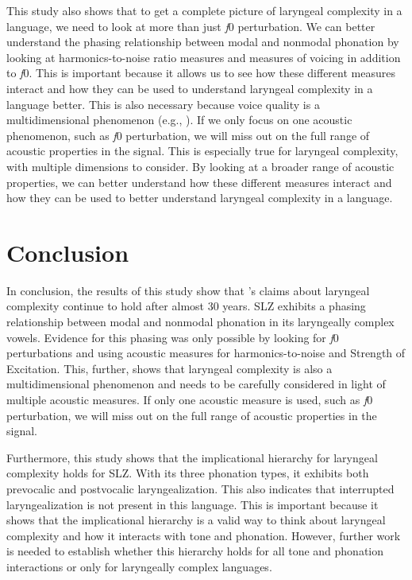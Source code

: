 This study also shows that to get a complete picture of laryngeal complexity in a language, we need to look at more than just \textit{f}0 perturbation. We can better understand the phasing relationship between modal and nonmodal phonation by looking at harmonics-to-noise ratio measures and measures of voicing in addition to \textit{f}0. This is important because it allows us to see how these different measures interact and how they can be used to understand laryngeal complexity in a language better. This is also necessary because voice quality is a multidimensional phenomenon (e.g., \cite{kreimanUnifiedTheoryVoice2014,kreimanValidatingPsychoacousticModel2021}). If we only focus on one acoustic phenomenon, such as \textit{f}0 perturbation, we will miss out on the full range of acoustic properties in the signal. This is especially true for laryngeal complexity, with multiple dimensions to consider. By looking at a broader range of acoustic properties, we can better understand how these different measures interact and how they can be used to better understand laryngeal complexity in a language.

\section{Conclusion}\label{sec:conclusion_of_lc}

In conclusion, the results of this study show that \citeauthor{silvermanLaryngealComplexityOtomanguean1997}'s \citeyear{silvermanLaryngealComplexityOtomanguean1997} claims about laryngeal complexity continue to hold after almost 30 years. SLZ exhibits a phasing relationship between modal and nonmodal phonation in its laryngeally complex vowels. Evidence for this phasing was only possible by looking for \textit{f}0 perturbations and using acoustic measures for harmonics-to-noise and Strength of Excitation. This, further, shows that laryngeal complexity is also a multidimensional phenomenon and needs to be carefully considered in light of multiple acoustic measures. If only one acoustic measure is used, such as \textit{f}0 perturbation, we will miss out on the full range of acoustic properties in the signal. 

Furthermore, this study shows that the implicational hierarchy for laryngeal complexity holds for SLZ. With its three phonation types, it exhibits both prevocalic and postvocalic laryngealization. This also indicates that interrupted laryngealization is not present in this language. This is important because it shows that the implicational hierarchy is a valid way to think about laryngeal complexity and how it interacts with tone and phonation. However, further work is needed to establish whether this hierarchy holds for all tone and phonation interactions or only for laryngeally complex languages. 